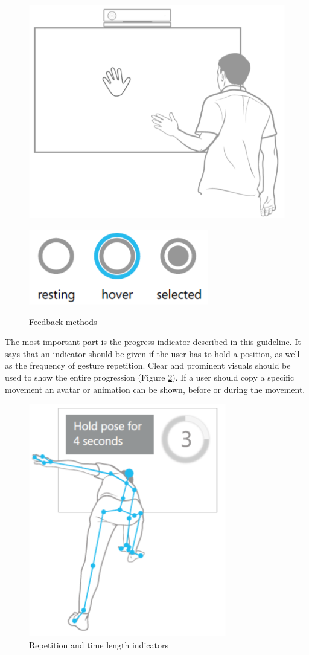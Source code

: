 \begin{figure}[htb]
	\centering
	\begin{minipage}[t]{0.45\linewidth}
		\centering
		\includegraphics[width=0.5\linewidth]{Pictures/hciGuidelinesFeedbackCursor}
		\label{fig:hciGuidelinesFeedbackCursor}
	\end{minipage}
	\hfill
	\begin{minipage}[t]{0.45\linewidth}
		\centering
		\includegraphics[width=0.5\linewidth]{Pictures/hciGuidelinesFeedbackControl}
		\label{fig:hciGuidelinesFeedbackControl}
	\end{minipage}
	\caption{Feedback methods~\cite{MicrosoftHIG2014-mh}}
	\label{fig:hciGuidelinesFeedback}
\end{figure}

The most important part is the progress indicator described in this guideline. It says that an indicator should be given if the user has to hold a position, as well as the frequency of gesture repetition. Clear and prominent visuals should be used to show the entire progression (Figure \ref{fig:hciGuidelinesProgressIndicator}). If a user should copy a specific movement an avatar or animation can be shown, before or during the movement.

\begin{figure}[htb]
	\centering
	\begin{minipage}[t]{1\linewidth}
		\centering
		\includegraphics[width=0.27\linewidth]{Pictures/hciGuidelinesProgressIndicator}
		\caption{Repetition and time length indicators~\cite{MicrosoftHIG2014-mh}}
		\label{fig:hciGuidelinesProgressIndicator}
	\end{minipage}
\end{figure}


